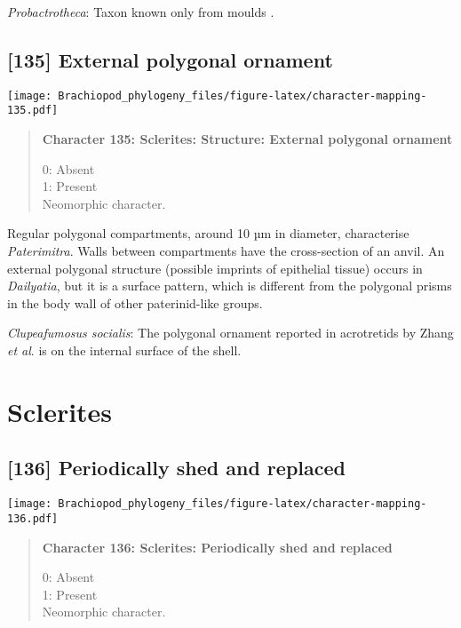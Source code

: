 \documentclass[openany]{book}
\theoremstyle{definition}
\theoremstyle{definition}
\theoremstyle{definition}
\theoremstyle{remark}
\begin{document}
\hypertarget{Probactrotheca-coding-134}{}
\emph{Probactrotheca}: Taxon known only from moulds \citep{Valent2012}.

\subsection*{{[}135{]} External polygonal
ornament}\label{external-polygonal-ornament}

\texttt{[image: Brachiopod\_phylogeny\_files/figure-latex/character-mapping-135.pdf]}

\begin{quote}
\textbf{Character 135: Sclerites: Structure: External polygonal
ornament}

0: Absent\\
1: Present\\
Neomorphic character.
\end{quote}

Regular polygonal compartments, around 10 µm in diameter, characterise
\emph{Paterimitra}. Walls between compartments have the cross-section of
an anvil. An external polygonal structure (possible imprints of
epithelial tissue) occurs in \emph{Dailyatia}, but it is a surface
pattern, which is different from the polygonal prisms in the body wall
of other paterinid-like groups.

\hypertarget{Clupeafumosus_socialis-coding-135}{}
\emph{Clupeafumosus socialis}: The polygonal ornament reported in
acrotretids by Zhang \emph{et al}. \citeyearpar{Zhang2016Epithelialcell}
is on the internal surface of the shell.

\section{Sclerites}\label{sclerites-1}

\subsection*{{[}136{]} Periodically shed and
replaced}\label{periodically-shed-and-replaced}

\texttt{[image: Brachiopod\_phylogeny\_files/figure-latex/character-mapping-136.pdf]}

\begin{quote}
\textbf{Character 136: Sclerites: Periodically shed and replaced}

0: Absent\\
1: Present\\
Neomorphic character.
\end{quote}
\end{document}
